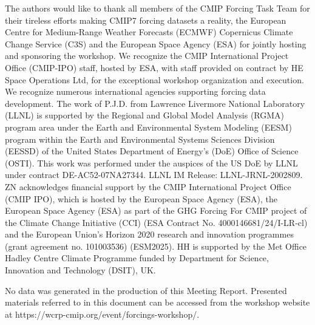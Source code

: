 \documentclass{ametsocV6.1}
\begin{document}
\clearpage
\acknowledgments
The authors would like to thank all members of the CMIP Forcing Task Team for their tireless efforts making CMIP7 forcing datasets a reality, the European Centre for Medium-Range Weather Forecasts (ECMWF) Copernicus Climate Change Service (C3S) and the European Space Agency (ESA) for jointly hosting and sponsoring the workshop. We recognize the CMIP International Project Office (CMIP-IPO) staff, hosted by ESA, with staff provided on contract by HE Space Operations Ltd, for the exceptional workshop organization and execution. We recognize numerous international agencies supporting forcing data development. The work of P.J.D. from Lawrence Livermore National Laboratory (LLNL) is supported by the Regional and Global Model Analysis (RGMA) program area under the Earth and Environmental System Modeling (EESM) program within the Earth and Environmental Systems Sciences Division (EESSD) of the United States Department of Energy’s (DoE) Office of Science (OSTI). This work was performed under the auspices of the US DoE by LLNL under contract DE-AC52-07NA27344. LLNL IM Release: LLNL-JRNL-2002809. ZN acknowledges financial support by the CMIP International Project Office (CMIP IPO), which is hosted by the European Space Agency (ESA), the European Space Agency (ESA) as part of the GHG Forcing For CMIP project of the Climate Change Initiative (CCI) (ESA Contract No. 4000146681/24/I-LR-cl) and the European Union's Horizon 2020 research and innovation programmes (grant agreement no. 101003536) (ESM2025). HH is supported by the Met Office Hadley Centre Climate Programme funded by Department for Science, Innovation and Technology (DSIT), UK.


% 
%
\datastatement
No data was generated in the production of this Meeting Report. Presented materials referred to in this document can be accessed from the workshop website at https://wcrp-cmip.org/event/forcings-workshop/.




\end{document}
